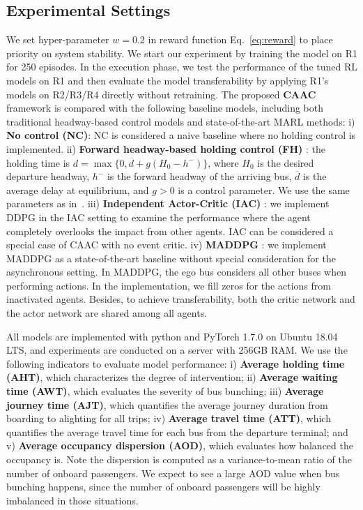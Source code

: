 \documentclass{article}
\newcommand{\citeay}[1]{\citeauthor{#1}\,\shortcite{#1}}
\begin{document}
\subsection{Experimental Settings}
We set hyper-parameter $w=0.2$ in reward function Eq.~\eqref{eq:reward} to place priority on system stability. We start our experiment by training the model on R1 for 250 episodes. In the execution phase, we test the performance of the tuned RL models on R1 and then evaluate the model transferability by applying R1's models on R2/R3/R4 directly without retraining.
The proposed \textbf{CAAC} framework is compared with the following baseline models, including both traditional headway-based control models and state-of-the-art MARL methods:
i) \textbf{No control (NC)}: NC is considered a naive baseline where no holding control is implemented.
ii) \textbf{Forward headway-based holding control (FH) } \cite{daganzo2009headway}: the holding time is $d=\max \{ 0, \overline{d}+g(H_0-h^-) \}$, where $H_0$ is the desired departure headway, $h^-$ is the  forward headway of the arriving bus, $\overline{d}$ is the average delay at equilibrium, and $g>0$ is a control parameter. We use the same parameters as in \citeay{daganzo2009headway}.
iii) \textbf{Independent Actor-Critic (IAC)} \cite{lillicrap2015continuous}: we implement DDPG in the IAC setting to examine the performance where the agent completely overlooks the impact from other agents. IAC can be considered a special case of CAAC with no event critic. iv) \textbf{MADDPG} \cite{lowe2017multi}: we implement MADDPG as a state-of-the-art baseline without special consideration for the asynchronous setting. In MADDPG, the ego bus considers all other buses when performing actions. In the implementation, we fill zeros for the actions from inactivated agents. Besides, to achieve transferability, both the critic network and the actor network are shared among all agents.


All models are implemented with python and PyTorch 1.7.0 on Ubuntu 18.04 LTS, and experiments are conducted on a server with 256GB RAM.
We use the following indicators to evaluate model performance: i) \textbf{Average holding time (AHT)}, which characterizes the degree of intervention; ii) \textbf{Average waiting time (AWT)}, which evaluates the severity of bus bunching; iii) \textbf{Average journey time (AJT)}, which quantifies the average journey duration from boarding to alighting for all trips; iv) \textbf{Average travel time (ATT)}, which quantifies the average travel time for each bus from the departure terminal; and v) \textbf{Average occupancy dispersion (AOD)}, which  evaluates how balanced the occupancy is. Note the dispersion is computed as a variance-to-mean ratio of the number of onboard passengers. We expect to see a large AOD value when bus bunching happens, since the number of onboard passengers will be highly imbalanced in those situations.
\end{document}
